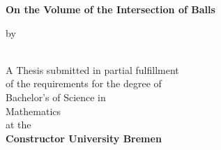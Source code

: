 \begin{titlepage}
    \begin{center}
        \vspace*{1cm}
        \Huge
        \textbf{On the Volume of the Intersection of Balls }
        \vspace{0.5cm}

       \Large
        by\\    
         \\
        
        \vfill
        
        A Thesis submitted in partial fulfillment\\
        of the requirements for the degree of\\
        Bachelor's of Science in\\
        Mathematics\\
        \vspace{1.8cm}
        \Huge
        at the\\ \textbf{Constructor University Bremen}\\
        \\
        \vspace{1.0cm}
        \begin{flushleft}
         
       
        \end{flushleft}
           \end{center}
    \end{titlepage}